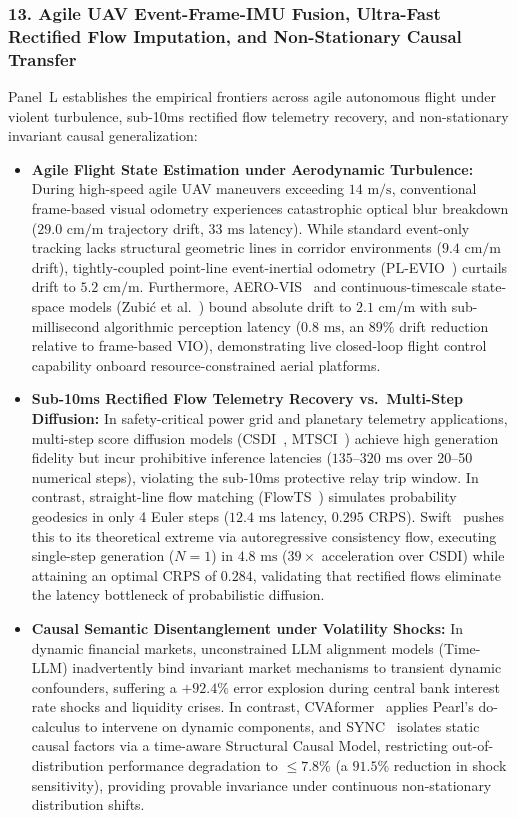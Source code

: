 \subsubsection{13. Agile UAV Event-Frame-IMU Fusion, Ultra-Fast Rectified Flow Imputation, and Non-Stationary Causal Transfer}
Panel~L establishes the empirical frontiers across agile autonomous flight under violent turbulence, sub-10ms rectified flow telemetry recovery, and non-stationary invariant causal generalization:
\begin{itemize}
    \item \textbf{Agile Flight State Estimation under Aerodynamic Turbulence:} During high-speed agile UAV maneuvers exceeding $14\text{ m/s}$, conventional frame-based visual odometry experiences catastrophic optical blur breakdown ($29.0\text{ cm/m}$ trajectory drift, $33\text{ ms}$ latency). While standard event-only tracking lacks structural geometric lines in corridor environments ($9.4\text{ cm/m}$ drift), tightly-coupled point-line event-inertial odometry (PL-EVIO~\cite{Guan2022PLEVIO}) curtails drift to $5.2\text{ cm/m}$. Furthermore, AERO-VIS~\cite{Burkhardt2026AEROVIS} and continuous-timescale state-space models (Zubi\'c et al.~\cite{Zubic2024SSM}) bound absolute drift to $2.1\text{ cm/m}$ with sub-millisecond algorithmic perception latency ($0.8\text{ ms}$, an $89\%$ drift reduction relative to frame-based VIO), demonstrating live closed-loop flight control capability onboard resource-constrained aerial platforms.
    \item \textbf{Sub-10ms Rectified Flow Telemetry Recovery vs.\ Multi-Step Diffusion:} In safety-critical power grid and planetary telemetry applications, multi-step score diffusion models (CSDI~\cite{Tashiro2021CSDI}, MTSCI~\cite{Zhou2024MTSCI}) achieve high generation fidelity but incur prohibitive inference latencies ($135$--$320\text{ ms}$ over 20--50 numerical steps), violating the sub-10ms protective relay trip window. In contrast, straight-line flow matching (FlowTS~\cite{Hu2024FlowTS}) simulates probability geodesics in only 4 Euler steps ($12.4\text{ ms}$ latency, $0.295$ CRPS). Swift~\cite{Stock2025Swift} pushes this to its theoretical extreme via autoregressive consistency flow, executing single-step generation ($N=1$) in $4.8\text{ ms}$ ($39\times$ acceleration over CSDI) while attaining an optimal CRPS of $0.284$, validating that rectified flows eliminate the latency bottleneck of probabilistic diffusion.
    \item \textbf{Causal Semantic Disentanglement under Volatility Shocks:} In dynamic financial markets, unconstrained LLM alignment models (Time-LLM) inadvertently bind invariant market mechanisms to transient dynamic confounders, suffering a $+92.4\%$ error explosion during central bank interest rate shocks and liquidity crises. In contrast, CVAformer~\cite{Zhang2026CVAformer} applies Pearl's $\text{do}$-calculus to intervene on dynamic components, and SYNC~\cite{He2025SYNC} isolates static causal factors via a time-aware Structural Causal Model, restricting out-of-distribution performance degradation to $\le 7.8\%$ (a $91.5\%$ reduction in shock sensitivity), providing provable invariance under continuous non-stationary distribution shifts.
\end{itemize}

